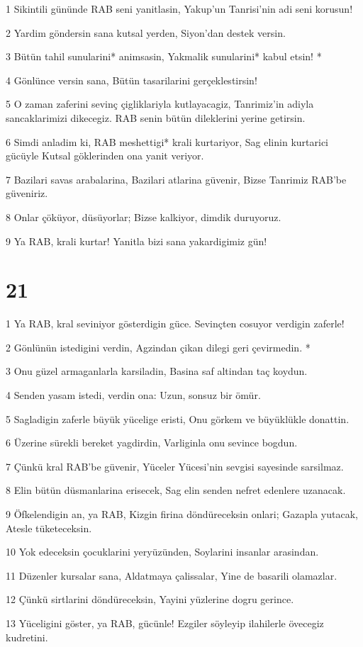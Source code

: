 \par 1 Sikintili gününde RAB seni yanitlasin, Yakup'un Tanrisi'nin adi seni korusun!
\par 2 Yardim göndersin sana kutsal yerden, Siyon'dan destek versin.
\par 3 Bütün tahil sunularini* animsasin, Yakmalik sunularini* kabul etsin! *
\par 4 Gönlünce versin sana, Bütün tasarilarini gerçeklestirsin!
\par 5 O zaman zaferini sevinç çigliklariyla kutlayacagiz, Tanrimiz'in adiyla sancaklarimizi dikecegiz. RAB senin bütün dileklerini yerine getirsin.
\par 6 Simdi anladim ki, RAB meshettigi* krali kurtariyor, Sag elinin kurtarici gücüyle Kutsal göklerinden ona yanit veriyor.
\par 7 Bazilari savas arabalarina, Bazilari atlarina güvenir, Bizse Tanrimiz RAB'be güveniriz.
\par 8 Onlar çöküyor, düsüyorlar; Bizse kalkiyor, dimdik duruyoruz.
\par 9 Ya RAB, krali kurtar! Yanitla bizi sana yakardigimiz gün!

\chapter{21}

\par 1 Ya RAB, kral seviniyor gösterdigin güce. Sevinçten cosuyor verdigin zaferle!
\par 2 Gönlünün istedigini verdin, Agzindan çikan dilegi geri çevirmedin. *
\par 3 Onu güzel armaganlarla karsiladin, Basina saf altindan taç koydun.
\par 4 Senden yasam istedi, verdin ona: Uzun, sonsuz bir ömür.
\par 5 Sagladigin zaferle büyük yücelige eristi, Onu görkem ve büyüklükle donattin.
\par 6 Üzerine sürekli bereket yagdirdin, Varliginla onu sevince bogdun.
\par 7 Çünkü kral RAB'be güvenir, Yüceler Yücesi'nin sevgisi sayesinde sarsilmaz.
\par 8 Elin bütün düsmanlarina erisecek, Sag elin senden nefret edenlere uzanacak.
\par 9 Öfkelendigin an, ya RAB, Kizgin firina döndüreceksin onlari; Gazapla yutacak, Atesle tüketeceksin.
\par 10 Yok edeceksin çocuklarini yeryüzünden, Soylarini insanlar arasindan.
\par 11 Düzenler kursalar sana, Aldatmaya çalissalar, Yine de basarili olamazlar.
\par 12 Çünkü sirtlarini döndüreceksin, Yayini yüzlerine dogru gerince.
\par 13 Yüceligini göster, ya RAB, gücünle! Ezgiler söyleyip ilahilerle övecegiz kudretini.


